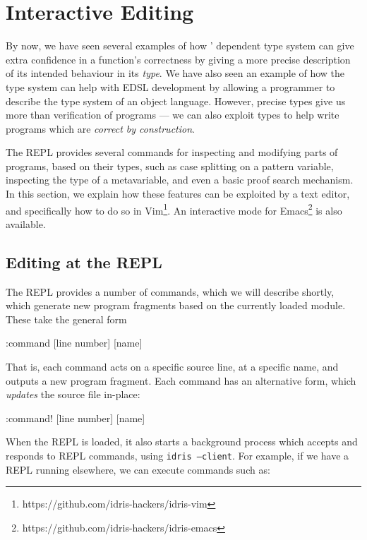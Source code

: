 \section{Interactive Editing}

By now, we have seen several examples of how \Idris{}' dependent type system
can give extra confidence in a function's correctness by giving a more
precise description of its intended behaviour in its \emph{type}. We have also
seen an example of how the type system can help with EDSL development by
allowing a programmer to describe the type system of an object language.
However, precise types give us more than verification of programs --- we
can also exploit types to help write programs which are
\emph{correct by construction}.

The \Idris{} REPL provides several commands for inspecting and modifying
parts of programs, based on their types, such as case splitting on a pattern
variable, inspecting the type of a metavariable, and even a basic proof
search mechanism. In this section, we explain how these features can be
exploited by a text editor, and specifically how to do so in 
Vim\footnote{https://github.com/idris-hackers/idris-vim}. 
An interactive mode for
Emacs\footnote{https://github.com/idris-hackers/idris-emacs} is also available.

\subsection{Editing at the REPL}

The REPL provides a number of commands, which we will describe shortly,
which generate new program fragments
based on the currently loaded module. These take the general form

\begin{code}
:command [line number] [name]
\end{code}

\noindent
That is, each command acts on a specific source line, at a specific name, and
outputs a new program fragment. Each command has an alternative form,
which \emph{updates} the source file in-place:

\begin{code}
:command! [line number] [name]
\end{code}

\noindent
When the REPL is loaded, it also starts a background process which accepts
and responds to REPL commands, using \texttt{idris --client}. For example,
if we have a REPL running elsewhere, we can execute commands such as:

